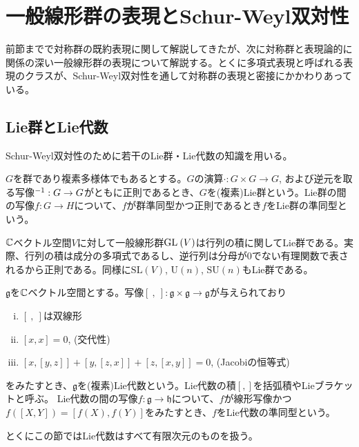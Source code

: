 \documentclass{ltjsreport}
\begin{document}
\section{一般線形群の表現とSchur-Weyl双対性}

前節までで対称群の既約表現に関して解説してきたが、次に対称群と表現論的に関係の深い一般線形群の表現について解説する。とくに多項式表現と呼ばれる表現のクラスが、Schur-Weyl双対性を通して対称群の表現と密接にかかわりあっている。



\subsection{Lie群とLie代数}
Schur-Weyl双対性のために若干のLie群・Lie代数の知識を用いる。

\begin{defin}[Lie群]
  $G$を群であり複素多様体でもあるとする。$G$の演算$\cdot:G\times G\rightarrow G$, および逆元を取る写像$^{-1}:G\rightarrow G$がともに正則であるとき、$G$を(複素)Lie群という。Lie群の間の写像$f:G\rightarrow H$について、$f$が群準同型かつ正則であるとき$f$をLie群の準同型という。
\end{defin}

\begin{eg}
  $\mathbb{C}$ベクトル空間$V$に対して一般線形群$\text{GL}\:(V)$は行列の積に関してLie群である。実際、行列の積は成分の多項式であるし、逆行列は分母が$0$でない有理関数で表されるから正則である。同様に$\text{SL}(V)$, $\text{U}(n)$, $\text{SU}(n)$もLie群である。
\end{eg}

\begin{defin}[Lie代数]
  $\mathfrak{g}$を$\mathbb{C}$ベクトル空間とする。写像$[\:,\:]:\mathfrak{g}\times \mathfrak{g}\rightarrow \mathfrak{g}$が与えられており
  \begin{enumerate}[(i)]
    \item $[\:,\:]$は双線形
    \item $[x,x]=0$, (交代性)
    \item $[x,[y,z]]+[y,[z,x]]+[z,[x,y]]=0$, (Jacobiの恒等式)
  \end{enumerate}
  をみたすとき、$\mathfrak{g}$を(複素)Lie代数という。Lie代数の積$[,]$を括弧積やLieブラケットと呼ぶ。
  Lie代数の間の写像$f:\mathfrak{g}\rightarrow \mathfrak{h}$について、$f$が線形写像かつ$f([X,Y])=[f(X),f(Y)]$をみたすとき、$f$をLie代数の準同型という。

  とくにこの節ではLie代数はすべて有限次元のものを扱う。
\end{defin}
\end{document}
